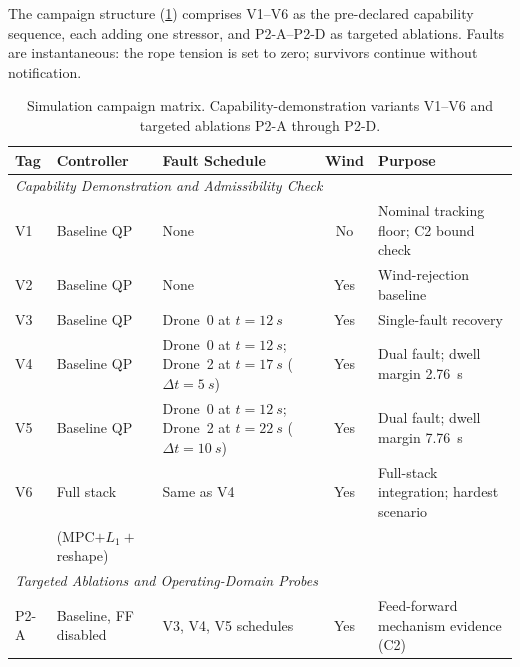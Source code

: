 \documentclass[lettersize,journal]{IEEEtran}
\begin{document}
The campaign structure (\cref{tab:campaign-matrix}) comprises V1--V6 as the pre-declared capability sequence, each adding one stressor, and P2-A--P2-D as targeted ablations. Faults are instantaneous: the rope tension is set to zero; survivors continue without notification.

\begin{table}[htbp]
  \caption{Simulation campaign matrix. Capability-demonstration variants V1--V6 and targeted ablations P2-A through P2-D.}
  \label{tab:campaign-matrix}
  \centering
  \begin{tabular}{llp{5.5cm}cp{5cm}}
    \toprule
    Tag & Controller            & Fault Schedule                                                                          & Wind & Purpose \\
    \midrule
    \multicolumn{5}{l}{\textit{Capability Demonstration and Admissibility Check}} \\[\smallskipamount]
    V1 & Baseline QP           & None                                                                                    & No   & Nominal tracking floor; C2 bound check \\
    V2 & Baseline QP           & None                                                                                    & Yes  & Wind-rejection baseline \\
    V3 & Baseline QP           & Drone~0 at $t{=}\SI{12}{s}$                                                             & Yes  & Single-fault recovery \\
    V4 & Baseline QP           & Drone~0 at $t{=}\SI{12}{s}$; Drone~2 at $t{=}\SI{17}{s}$ \mbox{($\Delta t{=}\SI{5}{s}$)}  & Yes  & Dual fault; dwell margin \SI{2.76}{s} \\
    V5 & Baseline QP           & Drone~0 at $t{=}\SI{12}{s}$; Drone~2 at $t{=}\SI{22}{s}$ \mbox{($\Delta t{=}\SI{10}{s}$)} & Yes  & Dual fault; dwell margin \SI{7.76}{s} \\
    V6 & Full stack            & Same as V4                                                                              & Yes  & Full-stack integration; hardest scenario \\
       & (MPC$+L_1+$reshape)  &                                                                                         &      & \\
    \midrule
    \multicolumn{5}{l}{\textit{Targeted Ablations and Operating-Domain Probes}} \\[\smallskipamount]
    P2-A & Baseline, FF disabled & V3, V4, V5 schedules                                                                 & Yes  & Feed-forward mechanism evidence (C2) \\

\end{tabular}
\end{table}
\end{document}
